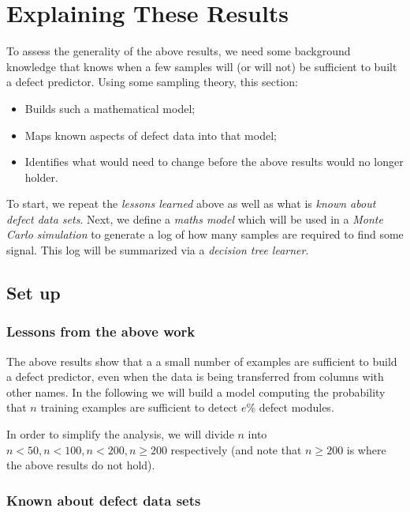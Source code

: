 

%

\newcommand{\tion}[1]{\S\ref{sect:#1}}
\newcommand{\fig}[1]{Figure~\ref{fig:#1}}
\newcommand{\eq}[1]{Equation~\ref{eq:#1}}
\newcommand{\bi}{\begin{itemize}}
\newcommand{\ei}{\end{itemize}}

\section{Explaining These Results}\label{sect:xplain}
To assess the generality of the above results, we need some background knowledge that knows when a few samples will (or will not)
be sufficient to built a defect predictor. Using some sampling theory, this section:
\bi
\item
Builds such a mathematical model;
\item Maps known aspects
of defect data  into that model;
\item Identifies what would need to change before the above results would no longer holder.
\ei
To start, we repeat the {\em lessons learned} above as well as what is {\em known about defect data sets}.
Next, we define a {\em maths model} which will be used in a {\em Monte Carlo simulation} to generate a log of how many samples are required
to find some signal. This log will be summarized via a {\em decision tree learner}.

\subsection{Set up}
\subsubsection{ Lessons from the above work}

The above results show
that a  
a small number
of examples are sufficient to build a defect predictor, even when the data is being transferred from columns with other names.
In the following we will build a model computing the probability that $n$ training examples are sufficient to detect $e$\% defect modules.

In order to simplify the analysis, we will divide $n$ into
  $n<50, n<100, n<200,n\ge 200$ respectively (and note that $n  \ge 200$ is where the above
  results do not hold).

\subsubsection{Known about defect data sets}\label{sect:data}

